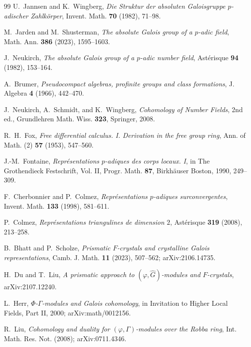 \documentclass[11pt]{article}
\theoremstyle{definition}
\begin{document}
\begin{thebibliography}{99}
U.~Jannsen and K.~Wingberg,
\emph{Die Struktur der absoluten Galoisgruppe $p$-adischer Zahlk\"orper},
Invent. Math. \textbf{70} (1982), 71--98.

M.~Jarden and M.~Shusterman,
\emph{The absolute Galois group of a $p$-adic field},
Math. Ann. \textbf{386} (2023), 1595--1603.

J.~Neukirch,
\emph{The absolute Galois group of a $p$-adic number field},
Ast\'erisque \textbf{94} (1982), 153--164.

A.~Brumer,
\emph{Pseudocompact algebras, profinite groups and class formations},
J. Algebra \textbf{4} (1966), 442--470.

J.~Neukirch, A.~Schmidt, and K.~Wingberg,
\emph{Cohomology of Number Fields}, 2nd ed.,
Grundlehren Math. Wiss. \textbf{323}, Springer, 2008.

R.~H.~Fox,
\emph{Free differential calculus. I. Derivation in the free group ring},
Ann. of Math. (2) \textbf{57} (1953), 547--560.

J.-M.~Fontaine,
\emph{Repr\'esentations $p$-adiques des corps locaux. I},
in The Grothendieck Festschrift, Vol. II, Progr. Math. \textbf{87},
Birkh\"auser Boston, 1990, 249--309.

F.~Cherbonnier and P.~Colmez,
\emph{Repr\'esentations $p$-adiques surconvergentes},
Invent. Math. \textbf{133} (1998), 581--611.

P.~Colmez,
\emph{Repr\'esentations triangulines de dimension $2$},
Ast\'erisque \textbf{319} (2008), 213--258.


B.~Bhatt and P.~Scholze,
\emph{Prismatic $F$-crystals and crystalline Galois representations},
Camb. J. Math. \textbf{11} (2023), 507--562; arXiv:2106.14735.

H.~Du and T.~Liu,
\emph{A prismatic approach to $(\varphi,\widehat G)$-modules and $F$-crystals},
arXiv:2107.12240.

L.~Herr,
\emph{$\Phi$-$\Gamma$-modules and Galois cohomology},
in Invitation to Higher Local Fields, Part II, 2000; arXiv:math/0012156.

R.~Liu,
\emph{Cohomology and duality for $(\varphi,\Gamma)$-modules over the Robba ring},
Int. Math. Res. Not. (2008); arXiv:0711.4346.


\end{thebibliography}
\end{document}

